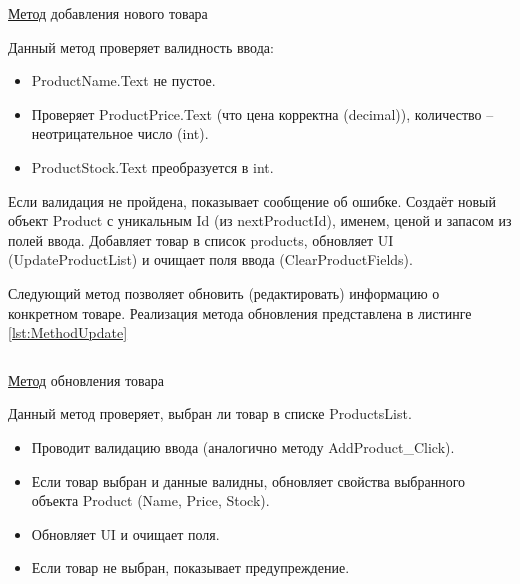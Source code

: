 \documentclass[12pt]{article}
\newcommand{\colorGIT}[1]{\textcolor{CtpLavender}{#1}}
\renewcommand{\texttt}[1]{{\small\ttfamily #1}}
\numberwithin{listing}{section}
\numberwithin{figure}{section}
\begin{document}
\begin{listing}[H]
	\inputminted[firstline=53, lastline=80]{csharp}{../../3lab/StoreManager/MainWindow.xaml.cs}
	\caption{\colorGIT{\href{https://github.com/WebMasterIT/Csharp_Labs/blob/ec375afd16c0647b337cf3d8a79c8bef904fc1be/3lab/StoreManager/MainWindow.xaml.cs\#L53-L80}{Метод}} добавления нового товара}
	\label{lst:MethodAdd}
\end{listing}

\noindent Данный метод проверяет валидность ввода:
\begin{itemize}
	\item \texttt{ProductName.Text} не пустое.
	\item Проверяет \texttt{ProductPrice.Text} (что цена корректна (\texttt{decimal})), количество -- неотрицательное число (\texttt{int}).
	\item \texttt{ProductStock.Text} преобразуется в \texttt{int}.
\end{itemize}

Если валидация не пройдена, показывает сообщение об ошибке. Создаёт новый объект \texttt{Product} с уникальным \texttt{Id} (из \texttt{nextProductId}), именем, ценой и запасом из полей ввода. Добавляет товар в список \texttt{products}, обновляет \texttt{UI} (\texttt{Update\-ProductList}) и очищает поля ввода (\texttt{Clear\-ProductFields}).

Следующий метод позволяет обновить (редактировать) информацию о конкретном товаре. Реализация метода обновления представлена в листинге \ref{lst:MethodUpdate}

\begin{listing}[H]
	\inputminted[firstline=82, lastline=110]{csharp}{../../3lab/StoreManager/MainWindow.xaml.cs}
	\caption{\colorGIT{\href{https://github.com/WebMasterIT/Csharp_Labs/blob/ec375afd16c0647b337cf3d8a79c8bef904fc1be/3lab/StoreManager/MainWindow.xaml.cs\#L82-L110}{Метод}} обновления товара}
	\label{lst:MethodUpdate}
\end{listing}

\noindent Данный метод проверяет, выбран ли товар в списке \texttt{ProductsList}.
\begin{itemize}
	\item Проводит валидацию ввода (аналогично методу \texttt{AddProduct\_Click}).
	\item Если товар выбран и данные валидны, обновляет свойства выбранного объекта \texttt{Product} (\texttt{Name}, \texttt{Price}, \texttt{Stock}).
	\item Обновляет \texttt{UI} и очищает поля.
	\item Если товар не выбран, показывает предупреждение.
\end{itemize}
\end{document}
